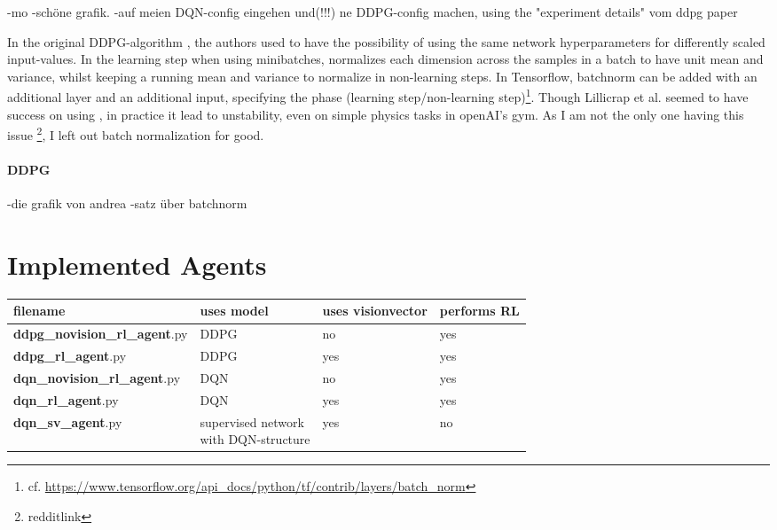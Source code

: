 -mo
-schöne grafik.
-auf meien DQN-config eingehen und(!!!) ne DDPG-config machen, using the "experiment details" vom ddpg paper  


In the original DDPG-algorithm \cite{lillicrap_continuous_2015}, the authors used  \cite{ioffe_batch_2015} to have the possibility of using the same network hyperparameters for differently scaled input-values. In the learning step when using minibatches, \batchnorm normalizes each dimension across the samples in a batch to have unit mean and variance, whilst keeping a running mean and variance to normalize in non-learning steps. In Tensorflow, batchnorm can be added with an additional layer and an additional input, specifying the phase (learning step/non-learning step)\footnote{cf. \url{https://www.tensorflow.org/api\_docs/python/tf/contrib/layers/batch_norm}}. Though Lillicrap et al. seemed to have success on using \batchnorm, in practice it lead to unstability, even on simple physics tasks in openAI's gym. As I am not the only one having this issue \footnote{redditlink}, I left out batch normalization for good.





\paragraph{DDPG}

-die grafik von andrea
-satz über batchnorm

\section{Implemented Agents}

\begin{tabular}{l l l l}
	filename & uses model & uses visionvector & performs RL\\
	\hline
	\textbf{ddpg\_novision\_rl\_agent}.py & DDPG & no & yes\\	
	\textbf{ddpg\_rl\_agent}.py & DDPG & yes & yes\\
	\textbf{dqn\_novision\_rl\_agent}.py & DQN & no & yes\\
	\textbf{dqn\_rl\_agent}.py & DQN & yes & yes\\
	\textbf{dqn\_sv\_agent}.py & \blap{supervised network\\ with DQN-structure} & yes & no\\[2em]
\end{tabular}


